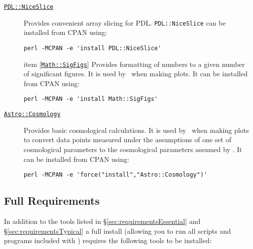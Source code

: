 \begin{description}
\item [\href{http://search.cpan.org/dist/PDL-NiceSlice/NiceSlice.pm}{{\tt PDL::NiceSlice}}] Provides convenient array slicing for PDL. {\tt PDL::NiceSlice} can be installed from CPAN using:
\begin{verbatim}
perl -MCPAN -e 'install PDL::NiceSlice'
\end{verbatim}

item [\href{http://search.cpan.org/~sbeck/Math-SigFigs-1.09/lib/Math/SigFigs.pod}{{\tt Math::SigFigs}}] Provides formatting of numbers to a given number of significant figures. It is used by \glc\ when making plots. It can be installed from CPAN using:
\begin{verbatim}
perl -MCPAN -e 'install Math::SigFigs'
\end{verbatim}

\item [\href{http://search.cpan.org/~djburke/Astro-Cosmology-0.90/Cosmology.pm}{{\tt Astro::Cosmology}}] Provides basic cosmological calculations. It is used by \glc\ when making plots to convert data points measured under the assumptions of one set of cosmological parameters to the cosmological parameters assumed by \glc. It can be installed from CPAN using:
\begin{verbatim}
perl -MCPAN -e 'force("install","Astro::Cosmology")'
\end{verbatim}
\end{description}

\subsection{Full Requirements}\label{sec:requirementsFull}

In addition to the tools listed in \S\ref{sec:requirementsEssential} and \S\ref{sec:requirementsTypical} a full install (allowing you to run all scripts and programs included with \glc) requires the following tools to be installed:

